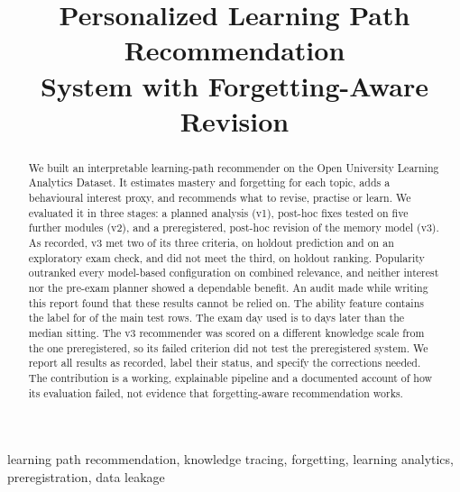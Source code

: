\documentclass[conference]{IEEEtran}
\begin{document}
\title{Personalized Learning Path Recommendation\\System with Forgetting-Aware Revision}

\author{
\and
{}
}

\maketitle

\begin{abstract}
We built an interpretable learning-path recommender on the Open University Learning Analytics Dataset. It estimates mastery and forgetting for each topic, adds a behavioural interest proxy, and recommends what to revise, practise or learn. We evaluated it in three stages: a planned analysis (v1), post-hoc fixes tested on five further modules (v2), and a preregistered, post-hoc revision of the memory model (v3). As recorded, v3 met two of its three criteria, on holdout prediction and on an exploratory exam check, and did not meet the third, on holdout ranking. Popularity outranked every model-based configuration on combined relevance, and neither interest nor the pre-exam planner showed a dependable benefit. An audit made while writing this report found that these results cannot be relied on. The ability feature contains the label for \LeakMain{} of the main test rows. The exam day used is \LateMin{} to \LateMax{} days later than the median sitting. The v3 recommender was scored on a different knowledge scale from the one preregistered, so its failed criterion did not test the preregistered system. We report all results as recorded, label their status, and specify the corrections needed. The contribution is a working, explainable pipeline and a documented account of how its evaluation failed, not evidence that forgetting-aware recommendation works.
\end{abstract}

\begin{IEEEkeywords}
learning path recommendation, knowledge tracing, forgetting, learning analytics, preregistration, data leakage
\end{IEEEkeywords}
\end{document}
